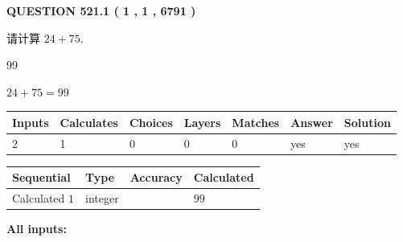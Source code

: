 \documentclass{ctexart}
\begin{document}
\vspace{0.2in}
  
{\textbf{\Large{QUESTION
521.1 
 ( 1 , 1 , 6791 )
}}}
  
  
 
请计算 $ %
24 +  %
75 $.
 
 
 
\noindent{}
 
 

99
 
 
\noindent{}
 
 

 
 
 
\noindent{}
 
 

$ %
24 +  %
75=   %
99$
 
 
\noindent{}
 
 

 
   
   
   
   
\noindent\begin{tabular}{|l|l|l|l|l|l|l|}
 \hline
Inputs & Calculates & Choices & Layers & Matches & Answer & Solution \\ \hline
 2  & 
 1  & 
 0
  & 
 0  & 
 0  & 
  yes & 
  yes 
  \\ \hline
 \end{tabular}
   
   
   
   
\noindent{}
   
   
  
  
\noindent\begin{tabular}{|l|l|l|l|}
\hline
 Sequential & Type & Accuracy & Calculated \\ 
\hline
 
 
  Calculated $  1 $ & integer &  & 
  $ 99 $ 
 \\  \hline  
 \end{tabular}
   
   
   
   
\noindent\vspace{0.1in}\hspace{-0.08in} {\textbf{\Large{All inputs: }}}
   
\end{document}

